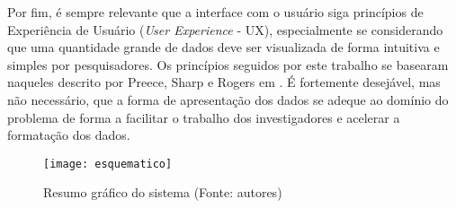 Por fim, é sempre relevante que a interface com o usuário siga princípios de Experiência de Usuário (\emph{User Experience} - UX), especialmente se considerando que uma quantidade grande de dados deve ser visualizada de forma intuitiva e simples por pesquisadores. Os princípios seguidos por este trabalho se basearam naqueles descrito por Preece, Sharp e Rogers em \cite{preece}. É fortemente desejável, mas não necessário, que a forma de apresentação dos dados se adeque ao domínio do problema de forma a facilitar o trabalho dos investigadores e acelerar a formatação dos dados.

\begin{figure}[ht]
  \centering
    \texttt{[image: esquematico]}
  \caption{Resumo gráfico do sistema (Fonte: autores)}
\end{figure}
\FloatBarrier
